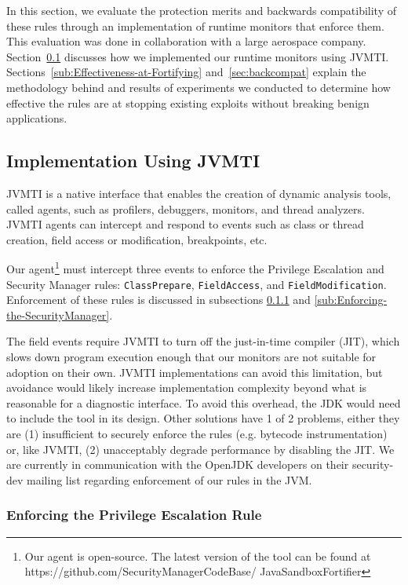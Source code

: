 \documentclass{sig-alternate}
\begin{document}
In this section, we evaluate the protection merits and backwards compatibility
of these rules through an implementation of runtime monitors that
enforce them. This evaluation was done in collaboration with a large aerospace
company.
Section~\ref{sub:Implementation-Using-JVMTI} discusses how we implemented
our runtime monitors using JVMTI. Sections~\ref{sub:Effectiveness-at-Fortifying} and~\ref{sec:backcompat} explain the methodology behind and results of experiments we conducted
to determine how effective the rules are at stopping existing exploits without
breaking benign applications. 

\subsection{Implementation Using JVMTI}\label{sub:Implementation-Using-JVMTI}

JVMTI is a native interface that enables the creation of
dynamic analysis tools, called agents, such as profilers, debuggers, monitors, and thread
analyzers. JVMTI agents can intercept and respond to events such as class
or thread creation, field access or modification, breakpoints, etc.

Our agent\footnote{Our agent is open-source. The latest version
of the tool can be found at https://github.com/SecurityManagerCodeBase/
JavaSandboxFortifier} must intercept three events to enforce the Privilege Escalation
and Security Manager rules: \texttt{ClassPrepare}, \texttt{FieldAccess},
and \texttt{FieldModification}. Enforcement of these rules is discussed in subsections \ref{sub:Enforcing-the-Privilege} and \ref{sub:Enforcing-the-SecurityManager}.

The field events require JVMTI to turn off the just-in-time compiler (JIT), which slows down program
execution enough that our monitors are not suitable for adoption on their
own. JVMTI implementations can avoid this limitation, but avoidance would likely
increase implementation complexity beyond what is reasonable for a diagnostic
interface. To avoid this overhead, the JDK would need to include the tool
in its design.
Other solutions have 1 of 2 problems, either they are (1) insufficient to 
securely enforce the rules
(e.g. bytecode instrumentation) or, like JVMTI, (2) unacceptably degrade
performance by disabling the JIT.
We are currently in communication with the OpenJDK developers on
their security-dev mailing list regarding enforcement of our rules in the JVM. 

\subsubsection{Enforcing the Privilege Escalation Rule}\label{sub:Enforcing-the-Privilege}
\end{document}
